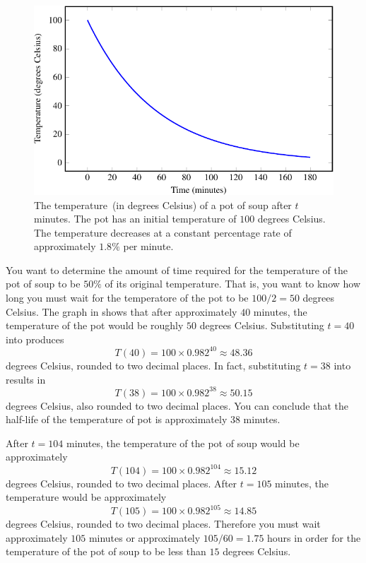 \documentclass[a4paper,oneside,12pt]{article}
\begin{document}
{\begin{solution}
\begin{figure}[!htbp]
\centering
\includegraphics[scale=1.1]{image/11/soup.pdf}
\caption{%
  The temperature~(in degrees Celsius) of a pot of soup after $t$
  minutes.  The pot has an initial temperature of $100$ degrees
  Celsius.  The temperature decreases at a constant percentage rate of
  approximately $1.8\%$ per minute.
}
\label{fig:soup_temperature}
\end{figure}

You want to determine the amount of time required for the temperature
of the pot of soup to be $50\%$ of its original temperature.  That is,
you want to know how long you must wait for the temperatore of the pot
to be $100 / 2 = 50$ degrees Celsius.  The graph in
 shows that after approximately $40$
minutes, the temperature of the pot would be roughly $50$ degrees
Celsius.  Substituting $t = 40$ into 
produces
\[
T(40)
=
100 \times 0.982^{40}
\approx
48.36
\]
degrees Celsius, rounded to two decimal places.  In fact, substituting
$t = 38$ into  results in
\[
T(38)
=
100 \times 0.982^{38}
\approx
50.15
\]
degrees Celsius, also rounded to two decimal places.  You can conclude
that the half-life of the temperature of pot is approximately $38$
minutes.

After $t = 104$ minutes, the temperature of the pot of soup would be
approximately
\[
T(104)
=
100 \times 0.982^{104}
\approx
15.12
\]
degrees Celsius, rounded to two decimal places.  After $t = 105$
minutes, the temperature would be approximately
\[
T(105)
=
100 \times 0.982^{105}
\approx
14.85
\]
degrees Celsius, rounded to two decimal places.  Therefore you must
wait approximately $105$ minutes or approximately
$105 / 60 = 1.75$ hours in order for the temperature of the pot of
soup to be less than $15$ degrees Celsius.
\end{solution}
}{}
\end{document}
